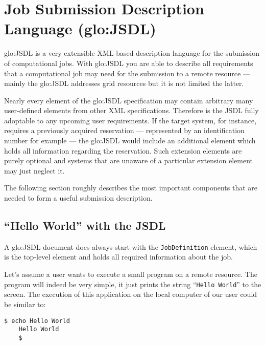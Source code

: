 \section[Job Submission Description Language]
{Job Submission Description Language (\gls{glo:JSDL})}
\label{sec:fundamentals:jsdl}

\gls{glo:JSDL} is a very extensible XML-based description language for the
submission  of computational jobs.   With \gls{glo:JSDL}  you are  able to
describe  all requirements  that  a  computational job  may  need for  the
submission to  a remote resource  --- mainly the  \gls{glo:JSDL} addresses
grid resources but it is not limited the latter.

Nearly  every  element of  the  \gls{glo:JSDL}  specification may  contain
arbitrary  many  user-defined  elements  from  other  XML  specifications.
Therefore is the  JSDL fully adoptable to any  upcoming user requirements.
If  the  target  system,  for  instance, requires  a  previously  acquired
reservation ---  represented by an  identification number for  example ---
the  \gls{glo:JSDL} would include  an additional  element which  holds all
information regarding the reservation.  Such extension elements are purely
optional and  systems that are  unaware of a particular  extension element
may just neglect it.

The following section roughly describes the most important components that
are needed to form a useful submission description.

\subsection{``Hello World'' with the JSDL}

A    \gls{glo:JSDL}    document     does    always    start    with    the
\texttt{JobDefinition} element,  which is the top-level  element and holds
all required information about the job.

Let's assume a user wants to execute a small program on a remote resource.
The  program  will  indeed be  very  simple,  it  just prints  the  string
``\texttt{Hello World}'' to the  screen. The execution of this application
on the local computer of our user could be similar to:

\begin{minipage}{0.75\textwidth}
  \begin{lstlisting}[language=ksh]
    $ echo Hello World
    Hello World
    $
  \end{lstlisting}
\end{minipage}


